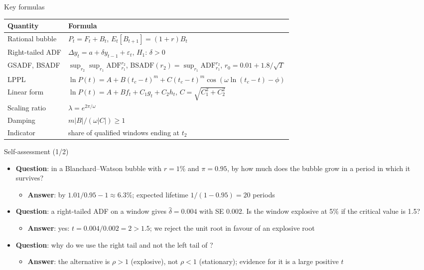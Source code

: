 \begin{frame}{Key formulas}
\itemsize{\small}
{\renewcommand{\arraystretch}{1.35}\begin{center}
\footnotesize
\begin{tabular}{ll}
\toprule
\textbf{Quantity} & \textbf{Formula} \\
\midrule
Rational bubble & $P_t = F_t + B_t$, \quad $E_t[B_{t+1}] = (1+r)B_t$ \\
Right-tailed ADF & $\Delta y_t = a + \delta y_{t-1} + \varepsilon_t$, \quad $H_1$: $\delta > 0$ \\
GSADF, BSADF & $\sup_{r_2}\sup_{r_1}\mathrm{ADF}_{r_1}^{r_2}$, \quad $\mathrm{BSADF}(r_2) = \sup_{r_1}\mathrm{ADF}_{r_1}^{r_2}$, \quad $r_0 = 0.01 + 1.8/\sqrt T$ \\
LPPL & $\ln P(t) = A + B(t_c - t)^m + C(t_c - t)^m\cos(\omega\ln(t_c - t) - \phi)$ \\
Linear form & $\ln P(t) = A + Bf_t + C_1g_t + C_2h_t$, \quad $C = \sqrt{C_1^2 + C_2^2}$ \\
Scaling ratio & $\lambda = e^{2\pi/\omega}$ \\
Damping & $m|B|/(\omega|C|) \ge 1$ \\
Indicator & share of qualified windows ending at $t_2$ \\
\bottomrule
\end{tabular}
\end{center}
}
\end{frame}

\begin{frame}{Self-assessment (1/2)}
\itemsize{\small}
\begin{itemize}
    \item \textbf{Question}: in a Blanchard--Watson bubble with $r = 1\%$ and $\pi = 0.95$, by how much does the bubble grow in a period in which it survives?
    \begin{itemize}
        \item \textbf{Answer}: by $1.01/0.95 - 1 \approx 6.3\%$; expected lifetime $1/(1 - 0.95) = 20$ periods
    \end{itemize}
    \item \textbf{Question}: a right-tailed ADF on a window gives $\hat\delta = 0.004$ with SE 0.002. Is the window explosive at 5\% if the critical value is 1.5?
    \begin{itemize}
        \item \textbf{Answer}: yes: $t = 0.004/0.002 = 2 > 1.5$; we reject the unit root in favour of an explosive root
    \end{itemize}
    \item \textbf{Question}: why do we use the right tail and not the left tail of ?
    \begin{itemize}
        \item \textbf{Answer}: the alternative is $\rho > 1$ (explosive), not $\rho < 1$ (stationary); evidence for it is a large positive $t$
    \end{itemize}
\end{itemize}
\end{frame}

